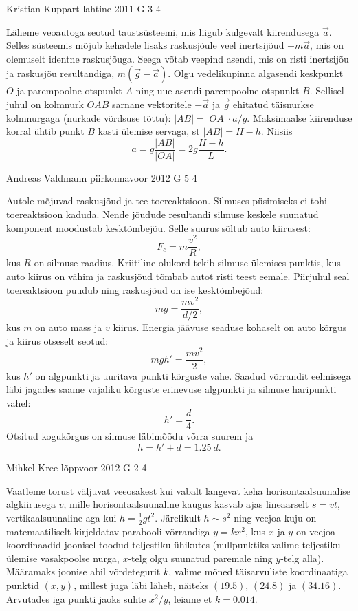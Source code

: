 \documentclass[11pt, twoside]{article}
\begin{document}
{%
{Kristian Kuppart} %
{lahtine} %
{2011} %
{G 3} %
{4} %
{

\ifSolution
Läheme veoautoga seotud taustsüsteemi, mis liigub kulgevalt kiirendusega $\vec a$. Selles süsteemis mõjub
kehadele lisaks raskusjõule veel inertsijõud $-m\vec a$, mis on olemuselt identne raskusjõuga.
Seega võtab veepind asendi, mis on risti inertsijõu ja raskusjõu resultandiga, $m(\vec g-\vec a)$.
Olgu vedelikupinna algasendi keskpunkt $O$ ja parempoolne otspunkt $A$ ning uue asendi parempoolne otspunkt $B$.
Sellisel juhul on kolmnurk $OAB$ sarnane vektoritele $-\vec a$ ja $\vec g$ ehitatud täisnurkse kolmnurgaga (nurkade võrdsuse tõttu):
$|AB|=|OA|\cdot a/g$. Maksimaalse kiirenduse korral ühtib punkt $B$ kasti ülemise servaga, st $|AB|=H-h$. Niisiis
\[
a=g\frac{|AB|}{|OA|}=2g\frac {H-h}{L}.
\]
\fi
}

{Andreas Valdmann} %
{piirkonnavoor} %
{2012} %
{G 5} %
{4} %
{

\ifSolution
Autole mõjuvad raskusjõud ja tee toereaktsioon. Silmuses püsimiseks ei tohi
toereaktsioon kaduda. Nende jõudude resultandi silmuse keskele
suunatud komponent moodustab kesktõmbejõu. Selle suurus sõltub auto kiirusest:
\[F_c=m\frac{v^2}{R},\]
kus $R$ on silmuse raadius.
Kriitiline olukord tekib silmuse ülemises punktis, kus auto kiirus on vähim ja
raskusjõud tõmbab autot risti teest eemale. Piirjuhul seal
toereaktsioon puudub ning raskusjõud on ise kesktõmbejõud:
\[ mg=\frac{mv^2}{d/2},\]
kus $m$ on auto mass ja $v$ kiirus.
Energia jäävuse seaduse kohaselt on auto kõrgus ja kiirus otseselt seotud:
\[ mgh'=\frac{mv^2}{2},\]
kus $h'$ on algpunkti ja uuritava punkti kõrguste vahe. Saadud võrrandit 
eelmisega läbi jagades saame vajaliku kõrguste erinevuse algpunkti ja silmuse 
haripunkti vahel:
\[ h'=\frac{d}{4}.\]
Otsitud kogukõrgus on silmuse läbimõõdu võrra suurem ja
\[ h=h'+d=\SI{1,25}{d}.\]
\fi
}

{Mihkel Kree} %
{lõppvoor} %
{2012} %
{G 2} %
{4} %
{

\ifSolution
Vaatleme torust väljuvat veeosakest kui vabalt langevat keha horisontaalsuunalise algkiirusega $v$, mille horisontaalsuunaline kaugus kasvab ajas lineaarselt $s=vt$, vertikaalsuunaline aga kui $h=\frac{1}{2}gt^2$. Järelikult $h\sim s^2$ ning veejoa kuju on matemaatiliselt kirjeldatav parabooli võrrandiga $y=kx^2$, kus $x$ ja $y$ on veejoa koordinaadid joonisel toodud teljestiku ühikutes (nullpunktiks valime teljestiku ülemise vasakpoolse nurga, $x$-telg olgu suunatud paremale ning $y$-telg alla). Määramaks joonise abil võrdetegurit $k$, valime mõned täisarvuliste koordinaatiga punktid $(x,y)$, millest juga läbi läheb, näiteks $(\num{19,5})$, $(\num{24,8})$ ja $(\num{34,16})$. Arvutades iga punkti jaoks suhte $x^2/y$, leiame et $k=\num{0.014}$. 
	
}}
\end{document}
